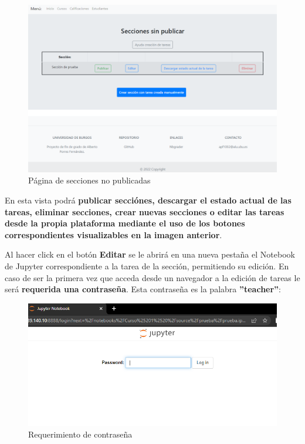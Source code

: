 \begin{figure}[H]
\centering
\includegraphics[width=\textwidth]{img/imgs-memoria/SeccionesNopbubli.PNG}
\caption{Página de secciones no publicadas}
\label{PagSecNoPublic}
\end{figure}

En esta vista podrá \textbf{publicar secciónes, descargar el estado actual de las tareas, eliminar secciones, crear nuevas secciones o editar las tareas desde la propia plataforma mediante el uso de los botones correspondientes visualizables en la imagen anterior}. 

Al hacer click en el botón \textbf{Editar} se le abrirá en una nueva pestaña el Notebook de Jupyter correspondiente a la tarea de la sección, permitiendo su edición. En caso de ser la primera vez que acceda desde un navegador a la edición de tareas le será \textbf{requerida una contraseña}. Esta contraseña es la palabra \textbf{''teacher''}:

\begin{figure}[H]
\centering
\includegraphics[width=\textwidth]{img/imgs-memoria/RequiereContra.PNG}
\caption{Requerimiento de contraseña}
\end{figure}


